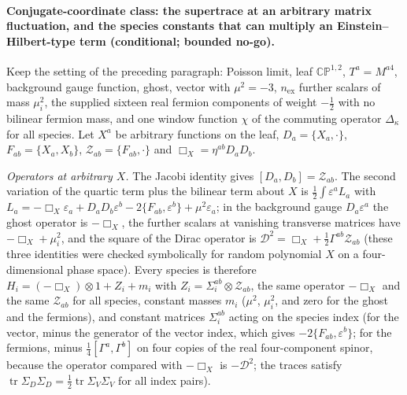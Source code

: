 \paragraph{Conjugate-coordinate class: the supertrace at an arbitrary matrix fluctuation, and the species constants that can multiply an Einstein--Hilbert-type term (conditional; bounded no-go).}
Keep the setting of the preceding paragraph: Poisson limit, leaf \(\mathbb{CP}^{1,2}\), \(T^a=M^{a4}\), background gauge function, ghost, vector with \(\mu^2=-3\), \(n_{\mathrm{ex}}\) further scalars of mass \(\mu_i^2\), the supplied sixteen real fermion components of weight \(-\tfrac12\) with no bilinear fermion mass, and one window function \(\chi\) of the commuting operator \(\Delta_\kappa\) for all species. Let \(X^a\) be arbitrary functions on the leaf, \(D_a=\{X_a,\cdot\}\), \(F_{ab}=\{X_a,X_b\}\), \(\mathcal Z_{ab}=\{F_{ab},\cdot\}\) and \(\Box_X=\eta^{ab}D_aD_b\).

\emph{Operators at arbitrary \(X\).} The Jacobi identity gives \([D_a,D_b]=\mathcal Z_{ab}\). The second variation of the quartic term plus the bilinear term about \(X\) is \(\tfrac12\int\varepsilon^aL_a\) with \(L_a=-\Box_X\varepsilon_a+D_aD_b\varepsilon^b-2\{F_{ab},\varepsilon^b\}+\mu^2\varepsilon_a\); in the background gauge \(D_a\varepsilon^a\) the ghost operator is \(-\Box_X\), the further scalars at vanishing transverse matrices have \(-\Box_X+\mu_i^2\), and the square of the Dirac operator is \(\mathcal D^2=\Box_X+\tfrac12\Gamma^{ab}\mathcal Z_{ab}\) (these three identities were checked symbolically for random polynomial \(X\) on a four-dimensional phase space). Every species is therefore \(H_i=(-\Box_X)\otimes1+Z_i+m_i\) with \(Z_i=\Sigma_i^{ab}\otimes\mathcal Z_{ab}\), the same operator \(-\Box_X\) and the same \(\mathcal Z_{ab}\) for all species, constant masses \(m_i\) (\(\mu^2\), \(\mu_i^2\), and zero for the ghost and the fermions), and constant matrices \(\Sigma_i^{ab}\) acting on the species index (for the vector, minus the generator of the vector index, which gives \(-2\{F_{ab},\varepsilon^b\}\); for the fermions, minus \(\tfrac14[\Gamma^a,\Gamma^b]\) on four copies of the real four-component spinor, because the operator compared with \(-\Box_X\) is \(-\mathcal D^2\); the traces satisfy \(\operatorname{tr}\Sigma_D\Sigma_D=\tfrac12\operatorname{tr}\Sigma_V\Sigma_V\) for all index pairs).

